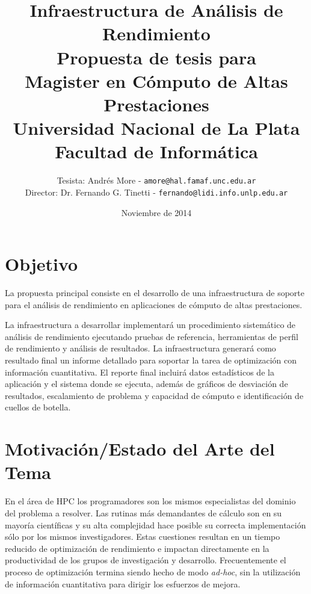 \documentclass[a4paper]{article}
\begin{document}
\title{Infraestructura de Análisis de Rendimiento\\
\bigskip
{\large Propuesta de tesis para\\} Magister en Cómputo de Altas Prestaciones\\
\bigskip
Universidad Nacional de La Plata\\
Facultad de Informática\\
\bigskip
}

\author{Tesista: Andrés More - {\tt amore@hal.famaf.unc.edu.ar}\\
Director: Dr. Fernando G. Tinetti - {\tt fernando@lidi.info.unlp.edu.ar}}

\date{Noviembre de 2014}

\maketitle

\newpage

\section{Objetivo}

La propuesta principal consiste en el desarrollo de una infraestructura de soporte para el análisis de rendimiento en aplicaciones de cómputo de altas prestaciones.

\bigskip

La infraestructura a desarrollar implementará un procedimiento sistemático de análisis de rendimiento ejecutando pruebas de referencia, herramientas de perfil de rendimiento y análisis de resultados.  La infraestructura generará como resultado final un informe detallado para soportar la tarea de optimización con información cuantitativa. El reporte final incluirá datos estadísticos de la aplicación y el sistema donde se ejecuta, además de gráficos de desviación de resultados, escalamiento de problema y capacidad de cómputo e identificación de cuellos de botella.

\section{Motivación/Estado del Arte del Tema}

En el área de HPC los programadores son los mismos especialistas del dominio del problema a resolver. Las rutinas más demandantes de cálculo son en su mayoría científicas y su alta complejidad hace posible su correcta implementación sólo por los mismos investigadores. Estas cuestiones resultan en un tiempo reducido de optimización de rendimiento e impactan directamente en la productividad de los grupos de investigación y desarrollo. Frecuentemente el proceso de optimización termina siendo hecho de modo {\it ad-hoc}, sin la utilización de información cuantitativa para dirigir los esfuerzos de mejora.
\end{document}
